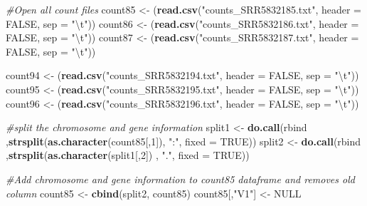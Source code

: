\documentclass[]{article}
\newenvironment{Shaded}{\begin{snugshade}}{\end{snugshade}}
\newcommand{\KeywordTok}[1]{\textcolor[rgb]{0.13,0.29,0.53}{\textbf{#1}}}
\newcommand{\DataTypeTok}[1]{\textcolor[rgb]{0.13,0.29,0.53}{#1}}
\newcommand{\DecValTok}[1]{\textcolor[rgb]{0.00,0.00,0.81}{#1}}
\newcommand{\CharTok}[1]{\textcolor[rgb]{0.31,0.60,0.02}{#1}}
\newcommand{\StringTok}[1]{\textcolor[rgb]{0.31,0.60,0.02}{#1}}
\newcommand{\CommentTok}[1]{\textcolor[rgb]{0.56,0.35,0.01}{\textit{#1}}}
\newcommand{\OtherTok}[1]{\textcolor[rgb]{0.56,0.35,0.01}{#1}}
\newcommand{\NormalTok}[1]{#1}
\begin{document}
\begin{Shaded}
\begin{Highlighting}[]
\CommentTok{#Open all count files}
\NormalTok{count85 <-}\StringTok{ }\NormalTok{(}\KeywordTok{read.csv}\NormalTok{(}\StringTok{"counts_SRR5832185.txt"}\NormalTok{, }\DataTypeTok{header =} \OtherTok{FALSE}\NormalTok{, }\DataTypeTok{sep =} \StringTok{"}\CharTok{\textbackslash{}t}\StringTok{"}\NormalTok{))}
\NormalTok{count86 <-}\StringTok{ }\NormalTok{(}\KeywordTok{read.csv}\NormalTok{(}\StringTok{"counts_SRR5832186.txt"}\NormalTok{, }\DataTypeTok{header =} \OtherTok{FALSE}\NormalTok{, }\DataTypeTok{sep =} \StringTok{"}\CharTok{\textbackslash{}t}\StringTok{"}\NormalTok{))}
\NormalTok{count87 <-}\StringTok{ }\NormalTok{(}\KeywordTok{read.csv}\NormalTok{(}\StringTok{"counts_SRR5832187.txt"}\NormalTok{, }\DataTypeTok{header =} \OtherTok{FALSE}\NormalTok{, }\DataTypeTok{sep =} \StringTok{"}\CharTok{\textbackslash{}t}\StringTok{"}\NormalTok{))}

\NormalTok{count94 <-}\StringTok{ }\NormalTok{(}\KeywordTok{read.csv}\NormalTok{(}\StringTok{"counts_SRR5832194.txt"}\NormalTok{, }\DataTypeTok{header =} \OtherTok{FALSE}\NormalTok{, }\DataTypeTok{sep =} \StringTok{"}\CharTok{\textbackslash{}t}\StringTok{"}\NormalTok{))}
\NormalTok{count95 <-}\StringTok{ }\NormalTok{(}\KeywordTok{read.csv}\NormalTok{(}\StringTok{"counts_SRR5832195.txt"}\NormalTok{, }\DataTypeTok{header =} \OtherTok{FALSE}\NormalTok{, }\DataTypeTok{sep =} \StringTok{"}\CharTok{\textbackslash{}t}\StringTok{"}\NormalTok{))}
\NormalTok{count96 <-}\StringTok{ }\NormalTok{(}\KeywordTok{read.csv}\NormalTok{(}\StringTok{"counts_SRR5832196.txt"}\NormalTok{, }\DataTypeTok{header =} \OtherTok{FALSE}\NormalTok{, }\DataTypeTok{sep =} \StringTok{"}\CharTok{\textbackslash{}t}\StringTok{"}\NormalTok{))}


\CommentTok{#split the chromosome and gene information}
\NormalTok{split1 <-}\StringTok{ }\KeywordTok{do.call}\NormalTok{(rbind ,}\KeywordTok{strsplit}\NormalTok{(}\KeywordTok{as.character}\NormalTok{(count85[,}\DecValTok{1}\NormalTok{]), }\StringTok{":"}\NormalTok{, }\DataTypeTok{fixed =} \OtherTok{TRUE}\NormalTok{))}
\NormalTok{split2 <-}\StringTok{ }\KeywordTok{do.call}\NormalTok{(rbind ,}\KeywordTok{strsplit}\NormalTok{(}\KeywordTok{as.character}\NormalTok{(split1[,}\DecValTok{2}\NormalTok{]) , }\StringTok{"."}\NormalTok{, }\DataTypeTok{fixed =} \OtherTok{TRUE}\NormalTok{))}

\CommentTok{#Add chromosome and gene information  to count85 dataframe and removes old column}
\NormalTok{count85 <-}\StringTok{ }\KeywordTok{cbind}\NormalTok{(split2, count85)}
\NormalTok{count85[,}\StringTok{"V1"}\NormalTok{] <-}\StringTok{ }\OtherTok{NULL}



\end{Highlighting}
\end{Shaded}
\end{document}
